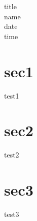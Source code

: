 \documentclass[10pt,a4j,report]{article}
\begin{document}
title\\
name\\
date\\
time


\section{sec1}
  test1
\section{sec2}
  test2
\section{sec3}
  test3

  
\end{document}

